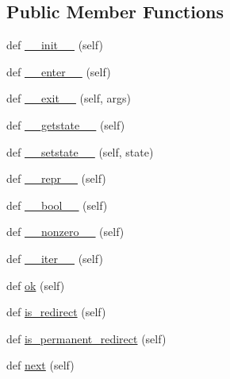 \subsection*{Public Member Functions}
\begin{DoxyCompactItemize}
\item 
def \hyperlink{classpip_1_1__vendor_1_1requests_1_1models_1_1Response_a43f5a6248235e41dd1566c968c25f1e2}{\+\_\+\+\_\+init\+\_\+\+\_\+} (self)
\item 
def \hyperlink{classpip_1_1__vendor_1_1requests_1_1models_1_1Response_af6d396f4db38edf1020b3804fada0396}{\+\_\+\+\_\+enter\+\_\+\+\_\+} (self)
\item 
def \hyperlink{classpip_1_1__vendor_1_1requests_1_1models_1_1Response_a96522d95f29f5ff3eb89fa65666b215a}{\+\_\+\+\_\+exit\+\_\+\+\_\+} (self, args)
\item 
def \hyperlink{classpip_1_1__vendor_1_1requests_1_1models_1_1Response_a5b9f9559ff5dbb7526f3e8de178cdcbe}{\+\_\+\+\_\+getstate\+\_\+\+\_\+} (self)
\item 
def \hyperlink{classpip_1_1__vendor_1_1requests_1_1models_1_1Response_ae861d75f0bb2c65f80aaf09745542978}{\+\_\+\+\_\+setstate\+\_\+\+\_\+} (self, state)
\item 
def \hyperlink{classpip_1_1__vendor_1_1requests_1_1models_1_1Response_a0b1d38c00f8de48ce461d513b1efea42}{\+\_\+\+\_\+repr\+\_\+\+\_\+} (self)
\item 
def \hyperlink{classpip_1_1__vendor_1_1requests_1_1models_1_1Response_addecc3993b3505c3e7081c6195be4f4a}{\+\_\+\+\_\+bool\+\_\+\+\_\+} (self)
\item 
def \hyperlink{classpip_1_1__vendor_1_1requests_1_1models_1_1Response_a3ac9f05f485f31ba4e55816c1566fde4}{\+\_\+\+\_\+nonzero\+\_\+\+\_\+} (self)
\item 
def \hyperlink{classpip_1_1__vendor_1_1requests_1_1models_1_1Response_a4f856cfa41d947d5b31fabfcf2d56a03}{\+\_\+\+\_\+iter\+\_\+\+\_\+} (self)
\item 
def \hyperlink{classpip_1_1__vendor_1_1requests_1_1models_1_1Response_a5e034889fee885f0e063b7b58d6a17d4}{ok} (self)
\item 
def \hyperlink{classpip_1_1__vendor_1_1requests_1_1models_1_1Response_ae28b0ce95db07fc6d0655474a70498b1}{is\+\_\+redirect} (self)
\item 
def \hyperlink{classpip_1_1__vendor_1_1requests_1_1models_1_1Response_a5c9dd092d5b5f6dfbb47b76a97077cda}{is\+\_\+permanent\+\_\+redirect} (self)
\item 
def \hyperlink{classpip_1_1__vendor_1_1requests_1_1models_1_1Response_a112b82fda481c7e3dd33af4f80806a6c}{next} (self)

\end{DoxyCompactItemize}
